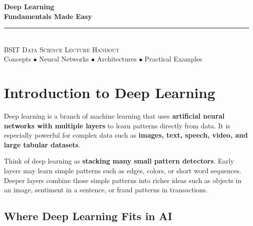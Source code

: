 \documentclass[11pt,a4paper]{article}
\begin{document}
\begin{center}
\vspace*{0.5cm}
{\Huge\bfseries\textcolor{primary}{Deep Learning}}\\[8pt]
{\Huge\bfseries\textcolor{primary}{Fundamentals Made Easy}}\\[16pt]
{\color{secondary}\rule{0.6\textwidth}{1.5pt}}\\[14pt]
{\Large\textsc{BSIT Data Science Lecture Handout}}\\[8pt]
{\large\textcolor{gray!70!black}{Concepts $\bullet$ Neural Networks $\bullet$ Architectures $\bullet$ Practical Examples}}
\vspace{0.3cm}
\end{center}

\tableofcontents
\newpage

\section{Introduction to Deep Learning}

\begin{definitionbox}
Deep learning is a branch of machine learning that uses \textbf{artificial neural networks with multiple layers} to learn patterns directly from data. It is especially powerful for complex data such as \textbf{images, text, speech, video, and large tabular datasets}.
\end{definitionbox}

\begin{conceptbox}
Think of deep learning as \textbf{stacking many small pattern detectors}. Early layers may learn simple patterns such as edges, colors, or short word sequences. Deeper layers combine those simple patterns into richer ideas such as objects in an image, sentiment in a sentence, or fraud patterns in transactions.
\end{conceptbox}

\subsection{Where Deep Learning Fits in AI}
\end{document}
